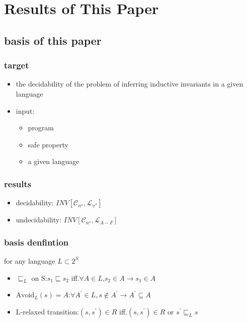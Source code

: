 \section{Results of This Paper}
\subsection{basis of this paper}
\begin{frame}
    \frametitle{target}
    \begin{itemize}
        \item the decidability of the problem of inferring inductive invariants in a given language
        \item input:
        \begin{itemize}
            \item program
            \item safe property
            \item a given language
        \end{itemize}
    \end{itemize}
\end{frame}
\begin{frame}
    \frametitle{results}
    \begin{itemize}
        \item decidability: $INV[\mathcal{C}_{n^{\star}},\mathcal{L}_{\forall^{\star}}]$
        \item undecidability: $INV[\mathcal{C}_{n^{\star}},\mathcal{L}_{A-F}]$
    \end{itemize}
\end{frame}
\begin{frame}
    \frametitle{basis denfintion}
    for any language $L\subset 2^{S}$
    \begin{itemize}
        \item $\sqsubseteq_{L}$ on S:$s_{1}\sqsubseteq s_{2}$ iff.$\forall A\in L$,$s_{2}\in A\rightarrow s_{1}\in A$
        \item $\text{Avoid}_{L}(s)=A$:$\forall A^{\prime}\in L, s\notin A^{\prime}\rightarrow A^{\prime}\subseteq A$
        \item L-relaxed transition:$(s,s^{\prime})\in R$ iff.$(s,s^{\prime})\in R$ or $s^{\prime}\sqsubseteq_{L}s$
    \end{itemize}
\end{frame}
